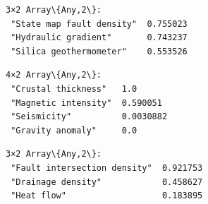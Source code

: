 \documentclass[11pt]{article}
\begin{document}
    \begin{Verbatim}[commandchars=\\\{\}]
3×2 Array\{Any,2\}:
 "State map fault density"  0.755023
 "Hydraulic gradient"       0.743237
 "Silica geothermometer"    0.553526
    \end{Verbatim}



    \begin{Verbatim}[commandchars=\\\{\}]
4×2 Array\{Any,2\}:
 "Crustal thickness"   1.0
 "Magnetic intensity"  0.590051
 "Seismicity"          0.0030882
 "Gravity anomaly"     0.0
    \end{Verbatim}



    \begin{Verbatim}[commandchars=\\\{\}]
3×2 Array\{Any,2\}:
 "Fault intersection density"  0.921753
 "Drainage density"            0.458627
 "Heat flow"                   0.183895
    \end{Verbatim}


    \begin{center}
    \end{center}
    { \hspace*{\fill} \\}

    \begin{Verbatim}[commandchars=\\\{\}]

    \end{Verbatim}
\end{document}
